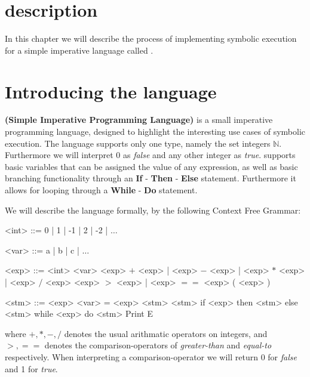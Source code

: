\section{description}

In this chapter we will describe the process of implementing symbolic execution for a simple imperative language called \simpl.

\section{Introducing the \simpl language}

\simpl\textbf{(Simple Imperative Programming Language)} is a small imperative programming language, designed to highlight the interesting use cases of symbolic execution. The language supports only one type, namely the set integers $\mathbb{N}$.
Furthermore we will interpret 0 as \emph{false} and any other integer as \emph{true}.
 \simpl supports basic
 variables that can be assigned the value of any expression, as well as basic branching functionality through an \textbf{If} - \textbf{Then} - \textbf{Else} statement. Furthermore it allows for looping through a \textbf{While} - \textbf{Do} statement.

We will describe the language formally, by the following Context Free Grammar:

\newpage
\begin{grammar}
	<int> ::= 0 | 1 | -1 | 2 | -2 | $\ldots$
	
	<var> ::= a | b | c | $\ldots$ 
	
	<exp> ::= <int>
	\alt <var>
	\alt <exp> $+$ <exp> | <exp> $-$ <exp> | <exp> $*$ <exp> | <exp> $/$ <exp>
	\alt <exp> $>$ <exp> | <exp> $==$ <exp> 
	\alt ( <exp> )	
	
	<stm> ::= <exp>
	\alt <var> = <exp>
	\alt <stm> <stm>
	\alt if <exp> then <stm> else <stm>
	\alt while <exp> do <stm>
	\alt Print E
	
\end{grammar}

where $+, *, -, /$ denotes the usual arithmatic operators on integers, and $>, ==$ denotes the comparison-operators of \emph{greater-than} and \emph{equal-to} respectively. When interpreting a comparison-operator we will return 0 for \emph{false} and 1 for \emph{true}. 